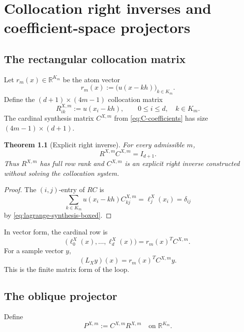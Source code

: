 \documentclass[11pt,oneside]{book}
\newtheorem{theorem}{Theorem}[chapter]
\theoremstyle{definition}
\theoremstyle{remark}
\newcommand{\R}{\mathbb R}
\begin{document}
\chapter{Collocation right inverses and coefficient-space projectors}
\label{ch:matrices}

\section{The rectangular collocation matrix}
Let \(r_m(x)\in\R^{K_m}\) be the atom vector
\begin{equation}
 r_m(x):=\bigl(u(x-kh)\bigr)_{k\in K_m}.
 \label{eq:atom-vector}
\end{equation}
Define the \((d+1)\times(4m-1)\) collocation matrix
\begin{equation}
 R^{X,m}_{ik}:=u(x_i-kh),
 \qquad 0\le i\le d,
 \quad k\in K_m.
 \label{eq:collocation-matrix}
\end{equation}
The cardinal synthesis matrix \(C^{X,m}\) from \cref{eq:C-coefficients} has size \((4m-1)\times(d+1)\).

\begin{theorem}[Explicit right inverse]
\label{thm:right-inverse}
For every admissible \(m\),
\begin{equation}
 \boxed{R^{X,m}C^{X,m}=I_{d+1}.}
 \label{eq:right-inverse}
\end{equation}
Thus \(R^{X,m}\) has full row rank and \(C^{X,m}\) is an explicit right inverse constructed without solving the collocation system.
\end{theorem}

\begin{proof}
The \((i,j)\)-entry of \(RC\) is
\[
 \sum_{k\in K_m}u(x_i-kh)C_{kj}^{X,m}
 =\ell_j^X(x_i)=\delta_{ij}
\]
by \cref{eq:lagrange-synthesis-boxed}.
\end{proof}

In vector form, the cardinal row is
\begin{equation}
 \bigl(\ell_0^X(x),\ldots,\ell_d^X(x)\bigr)
 =r_m(x)^TC^{X,m}.
 \label{eq:cardinal-row-factorization}
\end{equation}
For a sample vector \(y\),
\begin{equation}
 (L_Xy)(x)=r_m(x)^TC^{X,m}y.
 \label{eq:sample-factorization}
\end{equation}
This is the finite matrix form of the loop.

\section{The oblique projector}
Define
\begin{equation}
 P^{X,m}:=C^{X,m}R^{X,m}
 \quad\text{on }\R^{K_m}.
 \label{eq:coefficient-projector}
\end{equation}
\end{document}
